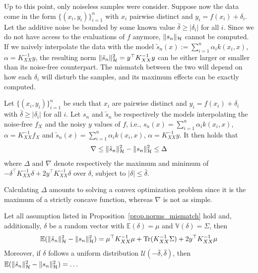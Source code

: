 Up to this point, only noiseless samples were consider. Suppose now the data come in the form $\{(x_i,y_i)\}_{i=1}^n$ with $x_i$ pairwise distinct and $y_i=f(x_i) + \delta_i$. Let the additive noise be bounded by some known value $\bar \delta \geq |\delta_i|$ for all $i$. Since we do not have access to the evaluations of $f$ anymore, $\Vert s_n \Vert_{\mathcal{H}}$ cannot be computed. If we naively interpolate the data with the model $\tilde s_n(x) := \sum_{i=1}^n \alpha_i k(x_i,x)$, $\alpha = K_{XX}^{-1} y$, the resulting norm $\Vert \tilde s_n \Vert_{\mathcal{H}}^2 = y^\top K_{XX}^{-1}y$ can be either larger or smaller than its noise-free counterpart. The mismatch between the two will depend on how each $\delta_i$ will disturb the samples, and its maximum effects can be exactly computed.

\begin{proposition}
	Let $\{(x_i,y_i)\}_{i=1}^n$ be such that $x_i$ are pairwise distinct and $y_i = f(x_i) + \delta_i$ with $\bar \delta \geq |\delta_i|$ for all $i$. Let $s_n$ and $\tilde s_n$ be respectively the models interpolating the noise-free $f_X$ and the noisy $y$ values of $f$, i.e., $s_n(x) = \sum_{i=1}^n \alpha_i k(x_i,x)$, $\alpha = K_{XX}^{-1} f_X$ and $\tilde s_n(x) = \sum_{i=1}^n \alpha_i k(x_i,x)$, $\alpha = K_{XX}^{-1} y$. It then holds that
	\begin{equation}
		\nabla \leq \Vert \tilde s_n \Vert_{\mathcal{H}}^2 - \Vert s_n \Vert_{\mathcal{H}}^2 \leq \Delta
	\end{equation}
	where $\Delta$ and $\nabla$ denote respectively the maximum and minimum of $-\delta^\top K_{XX}^{-1} \delta + 2y^\top K_{XX}^{-1} \delta$ over $\delta$, subject to $|\delta| \leq \bar \delta$.
	\label{prop.norms_mismatch}
\end{proposition}

Calculating $\Delta$ amounts to solving a convex optimization problem since it is the maximum of a strictly concave function, whereas $\nabla$ is not as simple.

\begin{proposition}
	Let all assumption listed in Proposition~\ref{prop.norms_mismatch} hold and, additionally, $\delta$ be a random vector with $\mathbb{E}(\delta) = \mu$ and $\mathbb{V}(\delta) = \Sigma$, then
	\begin{equation}
		\mathbb{E}(\Vert \tilde s_n \Vert_{\mathcal{H}}^2 - \Vert s_n \Vert_{\mathcal{H}}^2) = \mu^\top K_{XX}^{-1} \mu + \text{Tr}(K_{XX}^{-1}\Sigma) + 2y^\top K_{XX}^{-1} \mu
	\end{equation}
	Moreover, if $\delta$ follows a uniform distribution $\mathcal{U}(-\bar \delta, \bar \delta)$, then $\mathbb{E}(\Vert \tilde s_n \Vert_{\mathcal{H}}^2 - \Vert s_n \Vert_{\mathcal{H}}^2) = \dots$
	\label{prop.expected}
\end{proposition}

